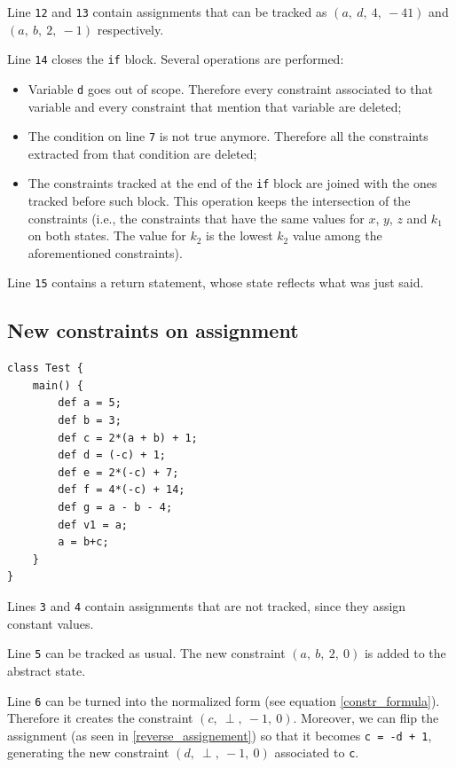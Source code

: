 \documentclass{article}
\newcommand{\spc}{\:}
\newcommand{\constraint}[4]{(#1,\spc #2,\spc #3,\spc #4)}
\newcommand{\linenum}[1]{\texttt{#1}}
\begin{document}
Line \linenum{12} and \linenum{13} contain assignments that can be tracked as $\constraint{a}{d}{4}{-41}$ and $\constraint{a}{b}{2}{-1}$ respectively.

Line \linenum{14} closes the \texttt{if} block. Several operations are performed:
\begin{itemize}
    \item Variable \texttt{d} goes out of scope. Therefore every constraint associated to that variable and every constraint that mention that variable are deleted;
    \item The condition on line \linenum{7} is not true anymore. Therefore all the constraints extracted from that condition are deleted;
    \item The constraints tracked at the end of the \texttt{if} block are joined with the ones tracked before such block. This operation keeps the intersection of the constraints (i.e., the constraints that have the same values for $x$, $y$, $z$ and $k_1$ on both states. The value for $k_2$ is the lowest $k_2$ value among the aforementioned constraints).
\end{itemize}

\noindent
Line \linenum{15} contains a return statement, whose state reflects what was just said.

\subsection{New constraints on assignment}
\begin{lstlisting}
class Test {
    main() {
        def a = 5;
        def b = 3;
        def c = 2*(a + b) + 1;
        def d = (-c) + 1;
        def e = 2*(-c) + 7;
        def f = 4*(-c) + 14;
        def g = a - b - 4;
        def v1 = a;
        a = b+c;
    }
}
\end{lstlisting}

Lines \linenum{3} and \linenum{4} contain assignments that are not tracked, since they assign constant values.

Line \linenum{5} can be tracked as usual. The new constraint $\constraint{a}{b}{2}{0}$ is added to the abstract state.

Line \linenum{6} can be turned into the normalized form (see equation \ref{constr_formula}). Therefore it creates the constraint $\constraint{c}{\perp}{-1}{0}$. Moreover, we can flip the assignment (as seen in \ref{reverse_assignement}) so that it becomes \texttt{c = -d + 1}, generating the new constraint $\constraint{d}{\perp}{-1}{0}$ associated to \texttt{c}.
\end{document}

